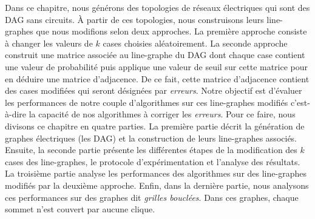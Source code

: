 Dans ce chapitre, nous g\'en\'erons des topologies de r\'eseaux \'electriques qui sont des DAG sans circuits. \`A partir de ces topologies, nous construisons leurs line-graphes  que nous modifions selon  deux approches.
La premi\`ere approche consiste \`a changer les valeurs de $k$ cases choisies al\'eatoirement.
La seconde approche construit une matrice associ\'ee au line-graphe du DAG dont chaque case contient une valeur de probabilit\'e puis applique une valeur de seuil sur cette matrice pour en d\'eduire une matrice d'adjacence. De ce fait, cette matrice d'adjacence contient des cases modifi\'ees qui seront d\'esign\'ees par {\em erreurs}. 
\newline
Notre objectif est d'\'evaluer les performances de notre couple d'algorithmes sur ces line-graphes modifi\'es c'est-\`a-dire la capacit\'e de nos algorithmes \`a corriger les {\em erreurs}.
 Pour ce faire, nous divisons ce chapitre en quatre parties. 
 La premi\`ere partie d\'ecrit la g\'en\'eration de graphes \'electriques (les DAG) et la construction de leurs line-graphes associ\'es. 
 Ensuite, la seconde partie pr\'esente les diff\'erentes \'etapes de la modification des $k$ cases des line-graphes, le protocole d'exp\'erimentation et l'analyse des r\'esultats.
 La troisi\`eme partie  analyse les performances des algorithmes sur des
 line-graphes modifi\'es par la deuxi\`eme approche.
 Enfin, dans la derni\`ere partie, nous analysons ces performances sur des graphes dit {\em grilles boucl\'ees}. Dans ces graphes, chaque sommet n'est couvert par aucune clique.